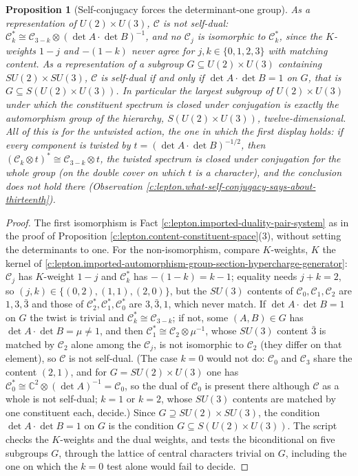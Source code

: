 \documentclass[11pt]{article}
\newtheorem{proposition}[theorem]{Proposition}
\theoremstyle{definition}
\theoremstyle{plain}
\providecommand{\C}{}\renewcommand{\C}{\mathbb{C}}
\providecommand{\Con}{}\renewcommand{\Con}{\mathcal{C}}
\begin{document}
\begin{proposition}[Self-conjugacy forces the determinant-one group]\label{c:lepton.self-conjugacy-forces-determinant-one-group}
As a representation of $U(2) \times U(3)$, $\Con$ is not self-dual: $\Con_{k}^{*} \cong \Con_{3-k} \otimes (\det A \cdot \det B)^{-1}$, and no $\Con_{j}$ is isomorphic to $\Con_{k}^{*}$, since the $K$-weights $1 - j$ and $-(1 - k)$ never agree for $j, k \in \{0, 1, 2, 3\}$ with matching content. As a representation of a subgroup $G \subseteq U(2) \times U(3)$ containing $SU(2) \times SU(3)$, $\Con$ is self-dual if and only if $\det A \cdot \det B = 1$ on $G$, that is $G \subseteq S(U(2) \times U(3))$. In particular the largest subgroup of $U(2) \times U(3)$ under which the constituent spectrum is closed under conjugation is exactly the automorphism group of the hierarchy, $S(U(2) \times U(3))$, twelve-dimensional. All of this is for the untwisted action, the one in which the first display holds: if every component is twisted by $t = (\det A \cdot \det B)^{-1/2}$, then $(\Con_{k} \otimes t)^{*} \cong \Con_{3-k} \otimes t$, the twisted spectrum is closed under conjugation for the whole group (on the double cover on which $t$ is a character), and the conclusion does not hold there (Observation \ref{c:lepton.what-self-conjugacy-says-about-thirteenth}).
\end{proposition}
\begin{proof}
The first isomorphism is Fact \ref{c:lepton.imported-duality-pair-system} as in the proof of Proposition \ref{c:lepton.content-constituent-space}(3), without setting the determinants to one. For the non-isomorphism, compare $K$-weights, $K$ the kernel of \ref{c:lepton.imported-automorphism-group-section-hypercharge-generator}: $\Con_{j}$ has $K$-weight $1 - j$ and $\Con_{k}^{*}$ has $-(1 - k) = k - 1$; equality needs $j + k = 2$, so $(j, k) \in \{(0,2), (1,1), (2,0)\}$, but the $SU(3)$ contents of $\Con_{0}, \Con_{1}, \Con_{2}$ are $1, 3, \bar{3}$ and those of $\Con_{2}^{*}, \Con_{1}^{*}, \Con_{0}^{*}$ are $3, \bar{3}, 1$, which never match. If $\det A \cdot \det B = 1$ on $G$ the twist is trivial and $\Con_{k}^{*} \cong \Con_{3-k}$; if not, some $(A, B) \in G$ has $\det A \cdot \det B = \mu \neq 1$, and then $\Con_{1}^{*} \cong \Con_{2} \otimes \mu^{-1}$, whose $SU(3)$ content $\bar{3}$ is matched by $\Con_{2}$ alone among the $\Con_{j}$, is not isomorphic to $\Con_{2}$ (they differ on that element), so $\Con$ is not self-dual. (The case $k = 0$ would not do: $\Con_{0}$ and $\Con_{3}$ share the content $(2,1)$, and for $G = SU(2) \times U(3)$ one has $\Con_{0}^{*} \cong \C^{2} \otimes (\det A)^{-1} = \Con_{0}$, so the dual of $\Con_{0}$ is present there although $\Con$ as a whole is not self-dual; $k = 1$ or $k = 2$, whose $SU(3)$ contents are matched by one constituent each, decide.) Since $G \supseteq SU(2) \times SU(3)$, the condition $\det A \cdot \det B = 1$ on $G$ is the condition $G \subseteq S(U(2) \times U(3))$. The script checks the $K$-weights and the dual weights, and tests the biconditional on five subgroups $G$, through the lattice of central characters trivial on $G$, including the one on which the $k = 0$ test alone would fail to decide.

\end{proof}
\end{document}
